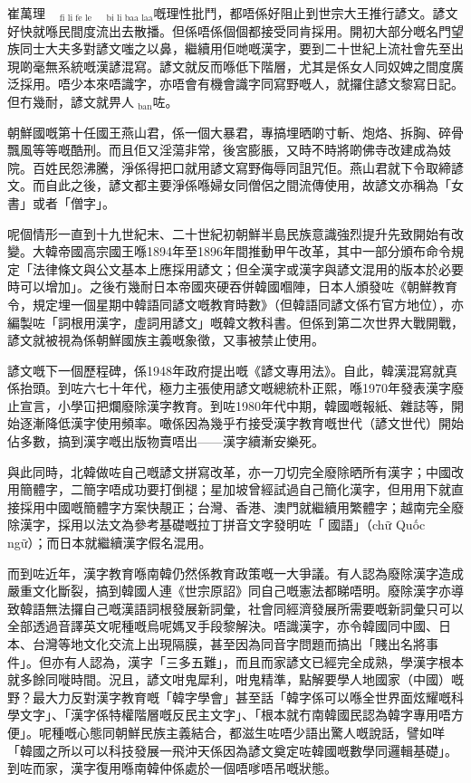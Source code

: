 \documentclass[a5paper, 10pt, openany]{book} %
\begin{document}
崔萬理$_{\text{fi li fe le}}$$_{\text{bi li baa laa}}$嘅理性批鬥，都唔係好阻止到世宗大王推行諺文。諺文好快就喺民間度流出去散播。但係唔係個個都接受同肯採用。開初大部分嘅名門望族同士大夫多對諺文嗤之以鼻，繼續用佢哋嘅漢字，要到二十世紀上流社會先至出現啲毫無系統嘅漢諺混寫。諺文就反而喺低下階層，尤其是係女人同奴婢之間度廣泛採用。唔少本來唔識字，亦唔會有機會識字同寫野嘅人，就攞住諺文黎寫日記。
但冇幾耐，諺文就畀人$_{\text{ban}}$咗。

朝鮮國嘅第十任國王燕山君，係一個大暴君，專搞埋晒啲寸斬、炮烙、拆胸、碎骨飄風等等嘅酷刑。而且佢又淫蕩非常，後宮膨脹，又時不時將啲佛寺改建成為妓院。百姓民怨沸騰，淨係得把口就用諺文寫野侮辱同詛咒佢。燕山君就下令取締諺文。而自此之後，諺文都主要淨係喺婦女同僧侶之間流傳使用，故諺文亦稱為「女書」或者「僧字」。

呢個情形一直到十九世紀末、二十世紀初朝鮮半島民族意識強烈提升先致開始有改變。大韓帝國高宗國王喺1894年至1896年間推動甲午改革，其中一部分頒布命令規定「法律條文與公文基本上應採用諺文；但全漢字或漢字與諺文混用的版本於必要時可以增加」。之後冇幾耐日本帝國夾硬吞併韓國嗰陣，日本人頒發咗《朝鮮教育令，規定埋一個星期中韓語同諺文嘅教育時數》（但韓語同諺文係冇官方地位），亦編製咗「詞根用漢字，虛詞用諺文」嘅韓文教科書。但係到第二次世界大戰開戰，諺文就被視為係朝鮮國族主義嘅象徵，又事被禁止使用。

諺文嘅下一個歷程碑，係1948年政府提出嘅《諺文專用法》。自此，韓漢混寫就真係抬頭。到咗六七十年代，極力主張使用諺文嘅總統朴正熙，喺1970年發表漢字廢止宣言，小學冚把爛廢除漢字教育。到咗1980年代中期，韓國嘅報紙、雜誌等，開始逐漸降低漢字使用頻率。噉係因為幾乎冇接受漢字教育嘅世代（諺文世代）開始佔多數，搞到漢字嘅出版物賣唔出——漢字續漸安樂死。

與此同時，北韓做咗自己嘅諺文拼寫改革，亦一刀切完全廢除晒所有漢字；中國改用簡體字，二簡字唔成功要打倒褪；星加坡曾經試過自己簡化漢字，但用用下就直接採用中國嘅簡體字方案快靚正；台灣、香港、澳門就繼續用繁體字；越南完全廢除漢字，採用以法文為參考基礎嘅拉丁拼音文字發明咗「𡨸國語」（chữ
Quốc ngữ）；而日本就繼續漢字假名混用。

而到咗近年，漢字教育喺南韓仍然係教育政策嘅一大爭議。有人認為廢除漢字造成嚴重文化斷裂，搞到韓國人連《世宗原詔》同自己嘅憲法都睇唔明。廢除漢字亦導致韓語無法攞自己嘅漢語詞根發展新詞彙，社會同經濟發展所需要嘅新詞彙只可以全部透過音譯英文呢種嘅烏呢媽叉手段黎解決。唔識漢字，亦令韓國同中國、日本、台灣等地文化交流上出現隔膜，甚至因為同音字問題而搞出「賤出名將事件」。但亦有人認為，漢字「三多五難」，而且而家諺文已經完全成熟，學漢字根本就多餘同嘥時間。況且，諺文咁鬼犀利，咁鬼精準，點解要學人地國家（中國）嘅野？最大力反對漢字教育嘅「韓字學會」甚至話「韓字係可以喺全世界面炫耀嘅科學文字」、「漢字係特權階層嘅反民主文字」、「根本就冇南韓國民認為韓字專用唔方便」。呢種嘅心態同朝鮮民族主義結合，都滋生咗唔少語出驚人嘅說話，譬如咩「韓國之所以可以科技發展一飛沖天係因為諺文奠定咗韓國嘅數學同邏輯基礎」。到咗而家，漢字復用喺南韓仲係處於一個唔嗲唔吊嘅狀態。
\end{document}
